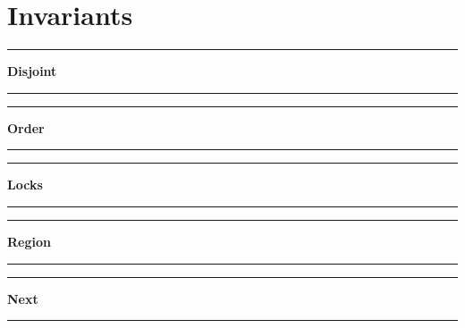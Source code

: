 





\chapter{Invariants}

\label{appendix::inv:full}

\begin{center}\rule{4cm}{0.4pt}  \textbf{Disjoint}  \rule{4cm}{0.4pt}\end{center}

\label{inv::full:disjoint}
\small{}\normalsize{}


\begin{center}\rule{4cm}{0.4pt}  \textbf{Order}  \rule{4cm}{0.4pt}\end{center}

\label{inv::full:order}
\small{}\normalsize{}


\begin{center}\rule{4cm}{0.4pt}  \textbf{Locks}  \rule{4cm}{0.4pt}\end{center}

\label{inv::full:lock}
\small{}\normalsize{}


\begin{center}\rule{4cm}{0.4pt}  \textbf{Region}  \rule{4cm}{0.4pt}\end{center}

\label{inv::full:region}
\small{}\normalsize{}


\begin{center}\rule{4cm}{0.4pt}  \textbf{Next}  \rule{4cm}{0.4pt}\end{center}

\label{inv::full:next}
\small{}\normalsize{}


